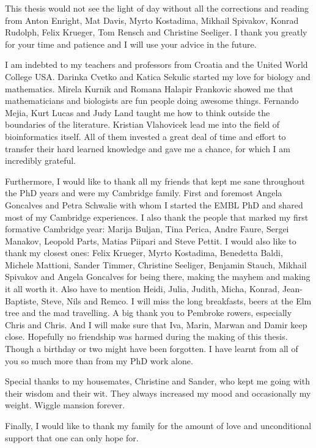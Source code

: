 \begin{acknowledgementslong}
This thesis would not see the light of day without all the corrections and reading from Anton Enright, Mat Davis, Myrto Kostadima, Mikhail Spivakov, Konrad Rudolph, Felix Krueger, Tom Rensch and Christine Seeliger. I thank you greatly for your time and patience and I will use your advice in the future.

I am indebted to my teachers and professors from Croatia and the United World College USA. Darinka Cvetko and Katica Sekulic started my love for biology and mathematics. Mirela Kurnik and Romana Halapir Frankovic showed me that mathematicians and biologists are fun people doing awesome things. Fernando Mejia, Kurt Lucas and Judy Land taught me how to think outside the boundaries of the literature. Kristian Vlahovicek lead me into the field of bioinformatics itself. All of them invested a great deal of time and effort to transfer their hard learned knowledge and gave me a chance, for which I am incredibly grateful.

Furthermore, I would like to thank all my friends that kept me sane throughout the PhD years and were my Cambridge family. First and foremost Angela Goncalves and Petra Schwalie with whom I started the EMBL PhD and shared most of my Cambridge experiences. I also thank the people that marked my first formative Cambridge year: Marija Buljan, Tina Perica, Andre Faure, Sergei Manakov, Leopold Parts, Matias Piipari and Steve Pettit. I would also like to thank my closest ones: Felix Krueger, Myrto Kostadima, Benedetta Baldi, Michele Mattioni, Sander Timmer, Christine Seeliger, Benjamin Stauch, Mikhail Spivakov and Angela Goncalves for being there, making the mayhem and making it all worth it. Also have to mention Heidi, Julia, Judith, Micha, Konrad, Jean-Baptiste, Steve, Nils and Remco.  I will miss the long breakfasts, beers at the Elm tree and the mad travelling. A big thank you to Pembroke rowers, especially Chris and Chris. And I will make sure that Iva, Marin, Marwan and Damir keep close. Hopefully no friendship was harmed during the making of this thesis. Though a birthday or two might have been forgotten. I have learnt from all of you so much more than from my PhD work alone. 

Special thanks to my housemates, Christine and Sander, who kept me going with their wisdom and their wit. They always increased my mood and occasionally my weight. Wiggle mansion forever.

Finally, I would like to thank my family for the amount of love and unconditional support that one can only hope for. 

\end{acknowledgementslong}


